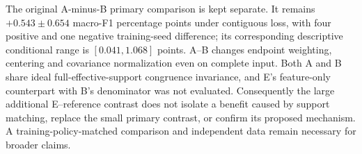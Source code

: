 The original A-minus-B primary comparison is kept separate. It remains
$+0.543\pm0.654$ macro-F1 percentage points under contiguous loss, with four
positive and one negative training-seed difference; its corresponding
descriptive conditional range is $[0.041,1.068]$ points. A--B changes
endpoint weighting, centering and covariance normalization even on complete
input. Both A and B share ideal full-effective-support congruence invariance,
and E's feature-only counterpart with B's denominator was not evaluated.
Consequently the large additional E--reference contrast does not isolate a
benefit caused by support matching, replace the small primary contrast, or
confirm its proposed mechanism. A training-policy-matched comparison and
independent data remain necessary for broader claims.



